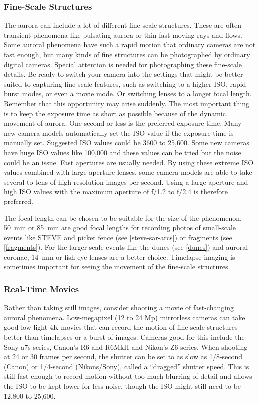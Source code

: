 \documentclass{article}
\begin{document}
\subsubsection{Fine-Scale Structures}

The aurora can include a lot of different fine-scale structures. These are often transient phenomena like pulsating aurora or thin fast-moving rays and flows. Some auroral phenomena have such a rapid motion that ordinary cameras are not fast enough, but many kinds of fine structures can be photographed by ordinary digital cameras. Special attention is needed for photographing these fine-scale details. Be ready to switch your camera into the settings that might be better suited to capturing fine-scale features, such as switching to a higher ISO, rapid burst modes, or even a movie mode. Or switching lenses to a longer focal length. Remember that this opportunity may arise suddenly. The most important thing is to keep the exposure time as short as possible because of the dynamic movement of aurora. One second or less is the preferred exposure time. Many new camera models automatically set the ISO value if the exposure time is manually set. Suggested ISO values could be 3600 to 25,600. Some new cameras have huge ISO values like 100,000 and these values can be tried but the noise could be an issue. Fast apertures are usually needed. By using these extreme ISO values combined with large-aperture lenses, some camera models are able to take several to tens of high-resolution images per second. Using a large aperture and high ISO values with the maximum aperture of f/1.2 to f/2.4 is therefore preferred. 

The focal length can be chosen to be suitable for the size of the phenomenon. 50~mm or 85~mm are good focal lengths for recording photos of small-scale events like STEVE and picket fence (see \ref{steve-sar-arcs}) or fragments (see \ref{fragments}). For the larger-scale events like the dunes (see \ref{dunes}) and auroral coronae, 14~mm or fish-eye lenses are a better choice. Timelapse imaging is sometimes important for seeing the movement of the fine-scale structures.


\subsubsection{Real-Time Movies}
Rather than taking still images, consider shooting a movie of fast-changing auroral phenomena. Low-megapixel (12 to 24 Mp) mirrorless cameras can take good low-light 4K movies that can record the motion of fine-scale structures better than timelapses or a burst of images. Cameras good for this include the Sony a7s series, Canon's R6 and R6MkII and Nikon's Z6 series. When shooting at 24 or 30 frames per second, the shutter can be set to as slow as 1/8-second (Canon) or 1/4-second (Nikons/Sony), called a ``dragged'' shutter speed. This is still fast enough to record motion without too much blurring of detail and allows the ISO to be kept lower for less noise, though the ISO might still need to be 12,800 to 25,600. 
\end{document}

